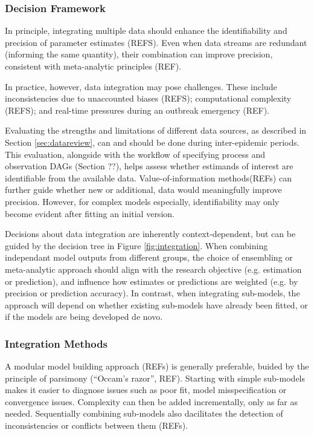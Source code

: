 \documentclass{article}
\begin{document}
\subsubsection{Decision Framework}

In principle, integrating multiple data should enhance the identifiability and precision of parameter estimates (REFS). Even when data streams are redundant (informing the same quantity), their combination can improve precision, consistent with meta-analytic principles (REF). 

In practice, however, data integration may pose challenges. These include inconsistencies due to unaccounted biases (REFS); computational complexity (REFS); and real-time pressures during an outbreak emergency (REF).

Evaluating the strengths and limitations of different data sources, as described in Section \ref{sec:datareview}, can and should be done during inter-epidemic periods. This evaluation, alongside with the workflow of specifying process and observation DAGs (Section ??), helps assess whether estimands of interest are identifiable from the available data. Value-of-information methods(REFs) can further guide whether new or additional, data would meaningfully improve precision. However, for complex models especially, identifiability may only become evident after fitting an initial version.

Decisions about data integration are inherently context-dependent, but can be guided by the decision tree in Figure \ref{fig:integration}. When combining independant model outputs from different groups, the choice of ensembling or meta-analytic approach should align with the research objective (e.g. estimation or prediction), and influence how estimates or predictions are weighted (e.g. by precision or prediction accuracy). In contrast, when integrating sub-models, the approach will depend on whether existing sub-models have already been fitted, or if the models are being developed de novo.

\subsubsection{Integration Methods}
A modular model building approach (REFs) is generally preferable, buided by the principle of parsimony (``Occam's razor'', REF). 
Starting with simple sub-models makes it easier to diagnose issues such as poor fit, model misspecification or convergence issues. Complexity can then be added incrementally, only as far as needed. Sequentially combining sub-models also dacilitates the detection of inconsistencies or conflicts between them (REFs). 
\end{document}
